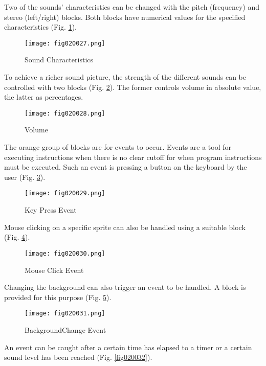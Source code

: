 Two of the sounds' characteristics can be changed with the pitch (frequency) and stereo (left/right) blocks. Both blocks have numerical values for the specified characteristics (Fig. \ref{fig020027}).

\begin{figure}[H]
   \centering
   \texttt{[image: fig020027.png]}
   \caption{Sound Characteristics}
\label{fig020027}
\end{figure}

To achieve a richer sound picture, the strength of the different sounds can be controlled with two blocks (Fig. \ref{fig020028}). The former controls volume in absolute value, the latter as percentages.

\begin{figure}[H]
   \centering
   \texttt{[image: fig020028.png]}
   \caption{Volume}
\label{fig020028}
\end{figure}

The orange group of blocks are for events to occur. Events are a tool for executing instructions when there is no clear cutoff for when program instructions must be executed. Such an event is pressing a button on the keyboard by the user (Fig. \ref{fig020029}).

\begin{figure}[H]
   \centering
   \texttt{[image: fig020029.png]}
   \caption{Key Press Event}
\label{fig020029}
\end{figure}

Mouse clicking on a specific sprite can also be handled using a suitable block (Fig. \ref{fig020030}).

\begin{figure}[H]
   \centering
   \texttt{[image: fig020030.png]}
   \caption{Mouse Click Event}
\label{fig020030}
\end{figure}

Changing the background can also trigger an event to be handled. A block is provided for this purpose (Fig. \ref{fig020031}).

\begin{figure}[H]
   \centering
   \texttt{[image: fig020031.png]}
   \caption{BackgroundChange Event}
\label{fig020031}
\end{figure}

An event can be caught after a certain time has elapsed to a timer or a certain sound level has been reached (Fig. \ref{fig020032}).

